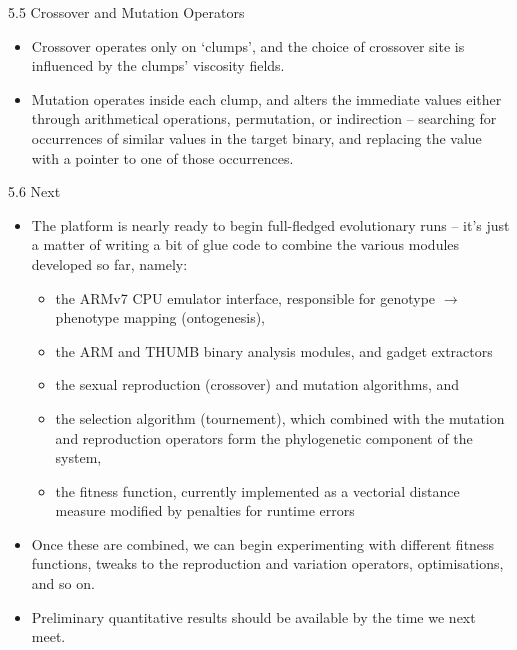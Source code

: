 \documentclass[9pt]{beamer}
\begin{document}
\begin{frame}{5.5 Crossover and Mutation Operators}


\begin{itemize}
    \item Crossover operates only on `clumps', and the choice of crossover site is influenced by the clumps' viscosity fields.

    \item  Mutation operates inside each clump, and alters the immediate values either through arithmetical operations, permutation, or indirection -- searching for occurrences of similar values in the target binary, and replacing the value with a pointer to one of those occurrences.
\end{itemize}
\end{frame}

\begin{frame}{5.6 Next}

\begin{itemize}
    \item The platform is nearly ready to begin full-fledged evolutionary runs -- it's just a matter of writing a bit of glue code to combine the various modules developed so far, namely:
    
    \begin{itemize}
        \item the ARMv7 CPU emulator interface, responsible for genotype $\rightarrow$ phenotype mapping (ontogenesis),
        \item the ARM and THUMB binary analysis modules, and gadget extractors
        \item the sexual reproduction (crossover) and mutation algorithms, and
        \item the selection algorithm (tournement), which combined with the mutation and reproduction operators form the phylogenetic component of the system,
        \item the fitness function, currently implemented as a vectorial distance measure modified by penalties for runtime errors
    \end{itemize}
    
    \item Once these are combined, we can begin experimenting with different fitness functions, tweaks to the reproduction and variation operators, optimisations, and so on. 
    \item Preliminary quantitative results should be available by the time we next meet. 
\end{itemize}


\end{frame}
\end{document}
